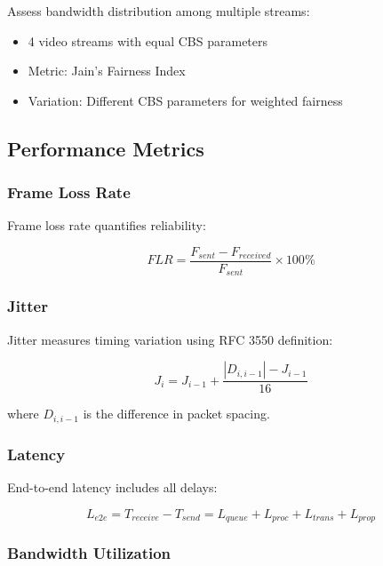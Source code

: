 \documentclass[10pt, journal, compsoc]{IEEEtran}
\begin{document}
Assess bandwidth distribution among multiple streams:
\begin{itemize}
    \item 4 video streams with equal CBS parameters
    \item Metric: Jain's Fairness Index
    \item Variation: Different CBS parameters for weighted fairness
\end{itemize}

\subsection{Performance Metrics}

\subsubsection{Frame Loss Rate}

Frame loss rate quantifies reliability:

\begin{equation}
FLR = \frac{F_{sent} - F_{received}}{F_{sent}} \times 100\%
\end{equation}

\subsubsection{Jitter}

Jitter measures timing variation using RFC 3550 definition:

\begin{equation}
J_i = J_{i-1} + \frac{|D_{i,i-1}| - J_{i-1}}{16}
\end{equation}

where $D_{i,i-1}$ is the difference in packet spacing.

\subsubsection{Latency}

End-to-end latency includes all delays:

\begin{equation}
L_{e2e} = T_{receive} - T_{send} = L_{queue} + L_{proc} + L_{trans} + L_{prop}
\end{equation}

\subsubsection{Bandwidth Utilization}
\end{document}
